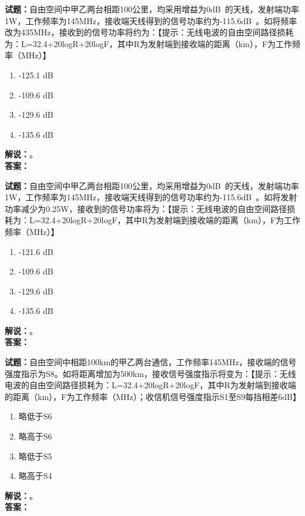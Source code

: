 \documentclass{ctexbook}
\begin{document}
\bigskip




\noindent\textbf{试题：}自由空间中甲乙两台相距100公里，均采用增益为0\unit[qualifier-mode=combine]{\deci\bel{}}的天线，发射端功率1W，工作频率为145\unit{\MHz}，接收端天线得到的信号功率约为-115.6\unit[qualifier-mode=combine]{\deci\bel{}}。如将频率改为435\unit{\MHz}，接收到的信号功率将约为：【提示：无线电波的自由空间路径损耗为：L=32.4+20logR+20logF，其中R为发射端到接收端的距离（km），F为工作频率（\unit{\MHz}）】
\begin{enumerate}[leftmargin=3em]
\item -125.1 \unit[qualifier-mode=combine]{\deci\bel{}}
\item -109.6 \unit[qualifier-mode=combine]{\deci\bel{}}
\item -129.6 \unit[qualifier-mode=combine]{\deci\bel{}}
\item -135.6 \unit[qualifier-mode=combine]{\deci\bel{}}
\end{enumerate}
\noindent\textbf{解说：}\textbf{}。\\\noindent\textbf{答案：}

\bigskip




\noindent\textbf{试题：}自由空间中甲乙两台相距100公里，均采用增益为0\unit[qualifier-mode=combine]{\deci\bel{}}的天线，发射端功率1W，工作频率为145\unit{\MHz}，接收端天线得到的信号功率约为-115.6\unit[qualifier-mode=combine]{\deci\bel{}}。如将发射功率减少为0.25W，接收到的信号功率将为：【提示：无线电波的自由空间路径损耗为：L=32.4+20logR+20logF，其中R为发射端到接收端的距离（km），F为工作频率（\unit{\MHz}）】
\begin{enumerate}[leftmargin=3em]
\item -121.6 \unit[qualifier-mode=combine]{\deci\bel{}}
\item -109.6 \unit[qualifier-mode=combine]{\deci\bel{}}
\item -129.6 \unit[qualifier-mode=combine]{\deci\bel{}}
\item -135.6 \unit[qualifier-mode=combine]{\deci\bel{}}
\end{enumerate}
\noindent\textbf{解说：}\textbf{}。\\\noindent\textbf{答案：}

\bigskip




\noindent\textbf{试题：}自由空间中相距100km的甲乙两台通信，工作频率145\unit{\MHz}，接收端的信号强度指示为S8。如将距离增加为500km，接收信号强度指示将变为：【提示：无线电波的自由空间路径损耗为：L=32.4+20logR+20logF，其中R为发射端到接收端的距离（km），F为工作频率（\unit{\MHz}）；收信机信号强度指示S1至S9每挡相差6dB】
\begin{enumerate}[leftmargin=3em]
\item 略低于S6
\item 略高于S6
\item 略低于S5
\item 略高于S4
\end{enumerate}
\noindent\textbf{解说：}\textbf{}。\\\noindent\textbf{答案：}
\end{document}
